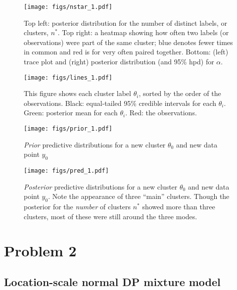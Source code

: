 \documentclass[12pt]{article}
\begin{document}
\begin{figure}[H]
\begin{center}
\texttt{[image: figs/nstar\_1.pdf]}
\caption{Top left: posterior distribution for the number of distinct labels, or clusters, $n^*$. Top right: a heatmap showing how often two labels (or observations) were part of the same cluster; blue denotes fewer times in common and red is for very often paired together. Bottom: (left) trace plot and (right) posterior distribution (and 95\% hpd) for $\alpha$.}
\end{center}
\end{figure}

\begin{figure}[H]
\begin{center}
\texttt{[image: figs/lines\_1.pdf]}
\caption{This figure shows each cluster label $\theta_i$, sorted by the order of the observations. Black: equal-tailed 95\% credible intervals for each $\theta_i$. Green: posterior mean for each $\theta_i$. Red: the observations.}
\end{center}
\end{figure}

\begin{figure}[H]
\begin{center}
\texttt{[image: figs/prior\_1.pdf]}
\caption{\emph{Prior} predictive distributions for a new cluster $\theta_0$ and new data point $y_0$}
\end{center}
\end{figure}

\begin{figure}[H]
\begin{center}
\texttt{[image: figs/pred\_1.pdf]}
\caption{\emph{Posterior} predictive distributions for a new cluster $\theta_0$ and new data point $y_0$. Note the appearance of three ``main'' clusters. Though the posterior for the \emph{number} of clusters $n^*$ showed more than three clusters, most of these were still around the three modes.}
\end{center}
\end{figure}


\newpage

\section*{Problem 2}

\subsection*{Location-scale normal DP mixture model}
\end{document}
